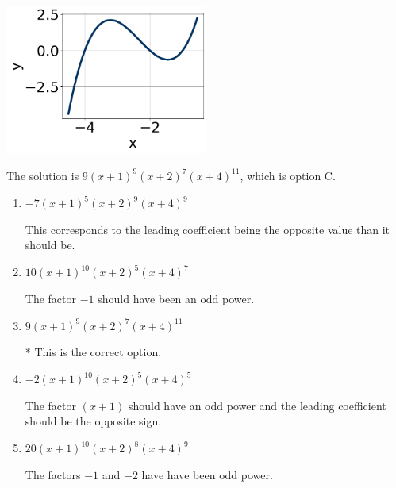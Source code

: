\documentclass{extbook}[14pt]
\begin{document}
\begin{enumerate}
{\begin{center}
    \includegraphics[width=0.5\textwidth]{../Figures/polyGraphToFunctionA.png}
\end{center}


The solution is \( 9(x + 1)^{9} (x + 2)^{7} (x + 4)^{11} \), which is option C.\begin{enumerate}[label=\Alph*.]
\item \( -7(x + 1)^{5} (x + 2)^{9} (x + 4)^{9} \)

This corresponds to the leading coefficient being the opposite value than it should be.
\item \( 10(x + 1)^{10} (x + 2)^{5} (x + 4)^{7} \)

The factor $-1$ should have been an odd power.
\item \( 9(x + 1)^{9} (x + 2)^{7} (x + 4)^{11} \)

* This is the correct option.
\item \( -2(x + 1)^{10} (x + 2)^{5} (x + 4)^{5} \)

The factor $(x + 1)$ should have an odd power and the leading coefficient should be the opposite sign.
\item \( 20(x + 1)^{10} (x + 2)^{8} (x + 4)^{9} \)

The factors $-1$ and $-2$ have have been odd power.
\end{enumerate}

}
\end{enumerate}
\end{document}
